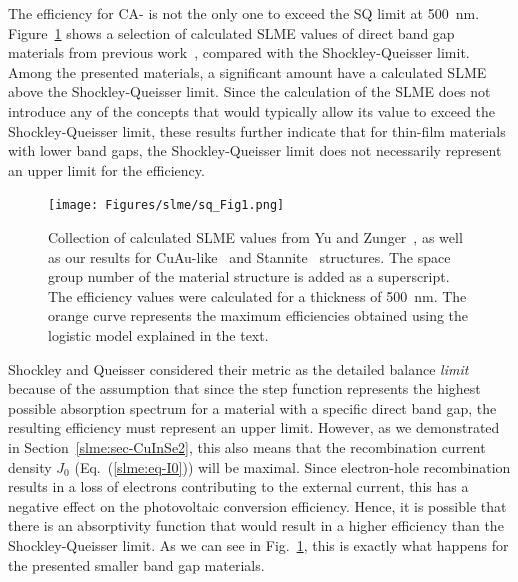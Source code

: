 \begin{refsection}
 
The efficiency for \gls{CA}- is not the only one to exceed the \gls{SQ} limit at 500~\si{\nano\meter}. 
Figure~\ref{slme:fig-logistic} shows a selection of calculated \gls{SLME} values of 
direct band gap materials from previous work~\cite{Yu2012, Bercx2016, 
Sarmadian2016}, compared with the Shockley-Queisser limit. Among the presented 
materials, a significant amount have a calculated \gls{SLME} 
above the Shockley-Queisser limit. Since the calculation of the \gls{SLME} does not 
introduce any of the concepts that would typically allow its value to exceed 
the Shockley-Queisser limit, these results further indicate that for thin-film 
materials with lower band gaps, the Shockley-Queisser limit does not 
necessarily represent an upper limit for the efficiency. 
 
\begin{figure}[ht] 
\captionsetup{width=0.9\textwidth}
\centering 
\texttt{[image: Figures/slme/sq\_Fig1.png]} 
\caption{Collection of calculated \gls{SLME} values from Yu and 
Zunger~\cite{Yu2012}, as well as our results for CuAu-like~\cite{Bercx2016} 
and Stannite~\cite{Sarmadian2016} structures. The space group number of 
the material structure is added as a superscript. The efficiency values were calculated 
for a thickness of 500~\si{\nano\meter}. The orange curve represents the 
maximum efficiencies obtained using the logistic model explained in the text.} 
\label{slme:fig-logistic} 
\end{figure} 
 
Shockley and Queisser considered their metric as the detailed balance 
\textit{limit} because of the assumption that since the step function 
represents the highest possible absorption spectrum for a material with a 
specific direct band gap, the resulting efficiency must represent an upper 
limit. However, as we demonstrated in Section~\ref{slme:sec-CuInSe2}, this 
also means that the recombination current density $J_0$ 
(Eq.~(\ref{slme:eq-I0})) will be maximal. Since electron-hole recombination 
results in a loss of electrons contributing to the external current, this has 
a negative effect on the photovoltaic conversion efficiency. Hence, it is 
possible that there is an absorptivity function that would result in a higher 
efficiency than the Shockley-Queisser limit. As we can see in 
Fig.~\ref{slme:fig-logistic}, this is exactly what happens for the presented 
smaller band gap materials. 
 

\end{refsection}
